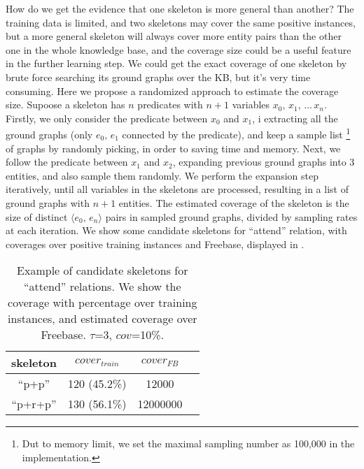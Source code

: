 How do we get the evidence that one skeleton is more general than 
another?
The training data is limited, and two skeletons may cover the same
positive instances, but a more general skeleton will always cover 
more entity pairs than the other one in the whole knowledge base, 
and the coverage size could be a useful feature in the further 
learning step.
We could get the exact coverage of one skeleton by brute force 
searching its ground graphs over the KB, but it's very time consuming.
Here we propose a randomized approach to estimate the coverage size.
Supoose a skeleton has $n$ predicates with $n+1$ variables 
$x_0,\, x_1,\, ...\, x_n$.
Firstly, we only consider the predicate between $x_0$ and $x_1$, i
extracting all the ground graphs (only $e_0,\, e_1$ connected by 
the predicate), and keep a sample list 
\footnote{Dut to memory limit, we set the maximal sampling number 
as 100,000 in the implementation.}
of graphs by randomly picking, in order to saving time and memory.
Next, we follow the predicate between $x_1$ and $x_2$, expanding 
previous ground graphs into 3 entities, and also sample them randomly.
We perform the expansion step iteratively, until all variables in 
the skeletons are processed, resulting in a list of ground graphs 
with $n+1$ entities.
The estimated coverage of the skeleton is the size of distinct 
$\langle e_0,\, e_n\rangle$ pairs in sampled ground graphs, divided
by sampling rates at each iteration.
We show some candidate skeletons for ``attend'' relation, with 
coverages over positive training instances and Freebase, displayed 
in .

\begin{table}[ht]
	\centering
	\caption{Example of candidate skeletons for ``attend'' relations.
		We show the coverage with percentage over training instances,
		and estimated coverage over Freebase. $\tau$=3, $cov$=10\%.}
	\begin{tabular}{|c|c|c|c|}
        \hline
		skeleton 	& $cover_{train}$	& $cover_{FB}$ \\
        \hline
        ``p+p''		& 120 (45.2\%)		& 12000  \\
        \hline
        ``p+r+p''	& 130 (56.1\%)		& 12000000 \\
        \hline
	\end{tabular}
	\label{tab:bfs-attend}
\end{table}


